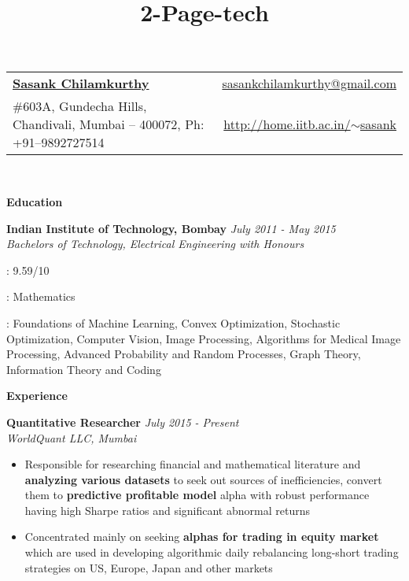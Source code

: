 \documentclass[a4paper,10pt]{article}
\title{2-Page-tech}
\newcommand{\resheading}[1]{
	{\large \colorbox{mygrey}{\begin{minipage}{\textwidth}{\textbf{#1 \vphantom{p\^{E}}}}\end{minipage}}}
}
\newcommand{\ressubheadingWithGuide}[3]{%

	\textbf{#1} \hfill \textit{#2}\null\\
	\textit{\small #3} %
	\vspace{-4pt}
}
\begin{document}
\newcommand{\mywebheader}{
\begin{tabular*}{7in}{l@{\extracolsep{\fill}}r}
	\textbf{\href{http://home.iitb.ac.in/~sasank}{\LARGE Sasank Chilamkurthy}} & \href{mailto:sasankchilamkurthy@gmail.com}{sasankchilamkurthy@gmail.com}\\
	\#603A, Gundecha Hills, Chandivali, Mumbai -- 400072, Ph: +91--9892727514  & \href{http://home.iitb.ac.in/~sasank}{http://home.iitb.ac.in/$\sim$sasank} \\
	\end{tabular*}
\\
\vspace{0.1in}}

\mywebheader

\resheading{Education}
	\ressubheadingWithGuide{Indian Institute of Technology, Bombay}{\textit{July 2011 - May 2015}}{Bachelors of Technology, Electrical Engineering with Honours}

				{ 
				\begin{description} \itemsep -1pt
					\item[CPI] : 9.59/10
					\item[Minor] : Mathematics
					\item[Key Courses] : Foundations of Machine Learning, Convex Optimization, Stochastic Optimization, Computer Vision, Image Processing, Algorithms for Medical Image Processing, Advanced Probability and Random Processes, Graph Theory, Information Theory and Coding
				\end{description}

				}

\resheading{Experience}
	\ressubheadingWithGuide{Quantitative Researcher}{July 2015 - Present}{WorldQuant LLC, Mumbai}
		\begin{itemize}\itemsep -1pt
            \item Responsible for researching financial and mathematical literature and \textbf{analyzing various datasets} to seek out sources of inefficiencies, convert them to \textbf{predictive profitable model} alpha with robust performance having high Sharpe ratios and significant abnormal returns
			\item Concentrated mainly on seeking \textbf{alphas for trading in equity market} which are used in developing algorithmic daily rebalancing long-short trading strategies on US, Europe, Japan and other markets
	    	\end{itemize}
\end{document}
